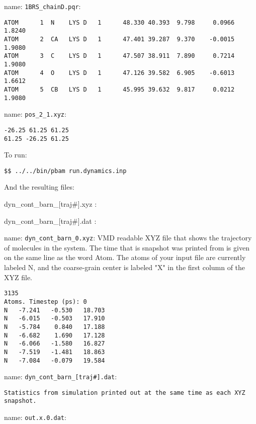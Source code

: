 name:  \texttt{1BRS\_chainD.pqr}:
\begin{lstlisting}[style = MyBash]
ATOM      1  N    LYS D   1      48.330 40.393  9.798     0.0966  1.8240
ATOM      2  CA   LYS D   1      47.401 39.287  9.370    -0.0015  1.9080
ATOM      3  C    LYS D   1      47.507 38.911  7.890     0.7214  1.9080
ATOM      4  O    LYS D   1      47.126 39.582  6.905    -0.6013  1.6612
ATOM      5  CB   LYS D   1      45.995 39.632  9.817     0.0212  1.9080
\end{lstlisting}

\medskip

name:  \texttt{pos\_2\_1.xyz}:
\begin{lstlisting}[style = MyBash]
-26.25 61.25 61.25
61.25 -26.25 61.25
\end{lstlisting}
\medskip

To run: 
\begin{lstlisting}[style = MyBash]
$$ ../../bin/pbam run.dynamics.inp
\end{lstlisting}
\medskip

And the resulting files: 

dyn\_cont\_barn\_[traj#].xyz : 

dyn\_cont\_barn\_[traj#].dat : 

name: \texttt{dyn\_cont\_barn\_0.xyz}: VMD readable XYZ file that shows the trajectory of molecules in the system. The time that is snapshot was printed from is given on the same line as the word Atom. The atoms of your input file are currently labeled N, and the coarse-grain center is labeled "X" in the first column of the XYZ file.
\begin{lstlisting}[style = MyBash]
3135
Atoms. Timestep (ps): 0
N   -7.241   -0.530   18.703
N   -6.015   -0.503   17.910
N   -5.784    0.840   17.188
N   -6.682    1.690   17.128
N   -6.066   -1.580   16.827
N   -7.519   -1.481   18.863
N   -7.084   -0.079   19.584
\end{lstlisting}
\medskip

name: \texttt{dyn\_cont\_barn\_[traj#].dat}:
\begin{lstlisting}[style = MyBash]
Statistics from simulation printed out at the same time as each XYZ snapshot.
\end{lstlisting}
\medskip

name: \texttt{out.x.0.dat}:
\begin{lstlisting}[style = MyBash]

\end{lstlisting}


